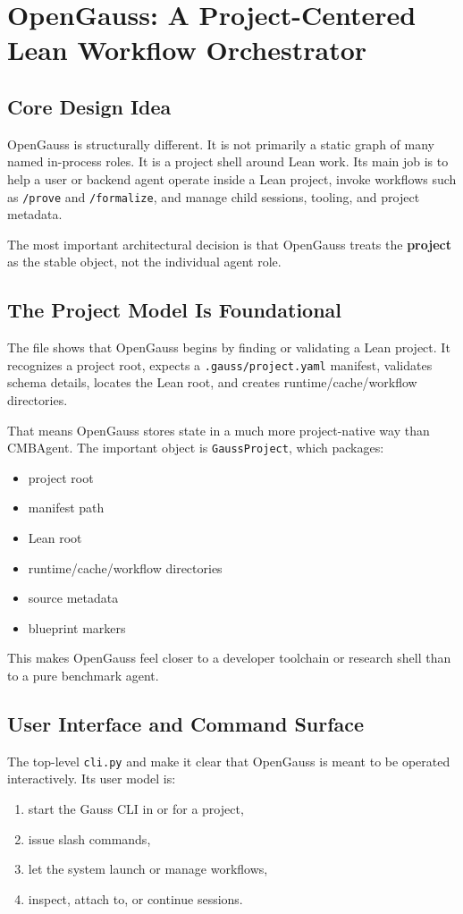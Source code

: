 \documentclass[11pt,a4paper]{article}
\begin{document}
\section{OpenGauss: A Project-Centered Lean Workflow Orchestrator}

\subsection{Core Design Idea}
OpenGauss is structurally different. It is not primarily a static graph of many
named in-process roles. It is a project shell around Lean work. Its main job is
to help a user or backend agent operate inside a Lean project, invoke workflows
such as \texttt{/prove} and \texttt{/formalize}, and manage child sessions,
tooling, and project metadata.

The most important architectural decision is that OpenGauss treats the
\textbf{project} as the stable object, not the individual agent role.

\subsection{The Project Model Is Foundational}
The file  shows that OpenGauss begins by finding
or validating a Lean project. It recognizes a project root, expects a
\texttt{.gauss/project.yaml} manifest, validates schema details, locates the
Lean root, and creates runtime/cache/workflow directories.

That means OpenGauss stores state in a much more project-native way than
CMBAgent. The important object is \texttt{GaussProject}, which packages:
\begin{itemize}[leftmargin=1.5em]
\item project root
\item manifest path
\item Lean root
\item runtime/cache/workflow directories
\item source metadata
\item blueprint markers
\end{itemize}

This makes OpenGauss feel closer to a developer toolchain or research shell than
to a pure benchmark agent.

\subsection{User Interface and Command Surface}
The top-level \texttt{cli.py} and  make it clear
that OpenGauss is meant to be operated interactively. Its user model is:
\begin{enumerate}[leftmargin=1.5em]
\item start the Gauss CLI in or for a project,
\item issue slash commands,
\item let the system launch or manage workflows,
\item inspect, attach to, or continue sessions.
\end{enumerate}
\end{document}
